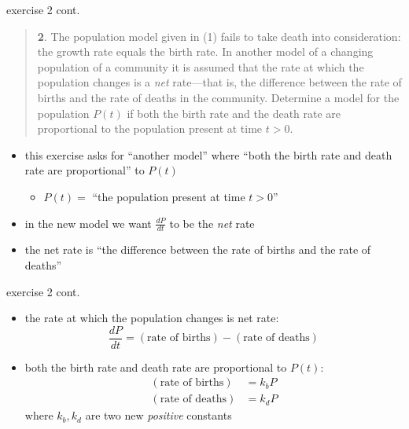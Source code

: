\documentclass{beamer}
\begin{document}
\begin{frame}{exercise 2 cont.}

\scriptsize
\begin{quotation}
\noindent \textbf{2}.  The population model given in (1) fails to take death into consideration: the growth rate equals the birth rate.  In another model of a changing population of a community it is assumed that the rate at which the population changes is a \emph{net} rate---that is, the difference between the rate of births and the rate of deaths in the community.  Determine a model for the population $P(t)$ if both the birth rate and the death rate are proportional to the population present at time $t>0$.
\end{quotation}

\normalsize
\bigskip

\begin{itemize}
\item this exercise asks for ``another model'' where ``both the birth rate and death rate are proportional'' to $P(t)$
    \begin{itemize}
    \item $P(t) =$ ``the population present at time $t>0$''
    \end{itemize}
\item in the new model we want $\frac{dP}{dt}$ to be the \emph{net} rate
\item the net rate is ``the difference between the rate of births and the rate of deaths''
\end{itemize}
\end{frame}


\begin{frame}{exercise 2 cont.}

\begin{itemize}
\item the rate at which the population changes is net rate:
    $$\frac{dP}{dt} = (\text{rate of births}) - (\text{rate of deaths})$$
\item both the birth rate and death rate are proportional to $P(t)$:
\begin{align*}
    (\text{rate of births}) &= k_b P \\
    (\text{rate of deaths}) &= k_d P
\end{align*}
where $k_b,k_d$ are two new \emph{positive} constants
\end{itemize}
\end{frame}
\end{document}

